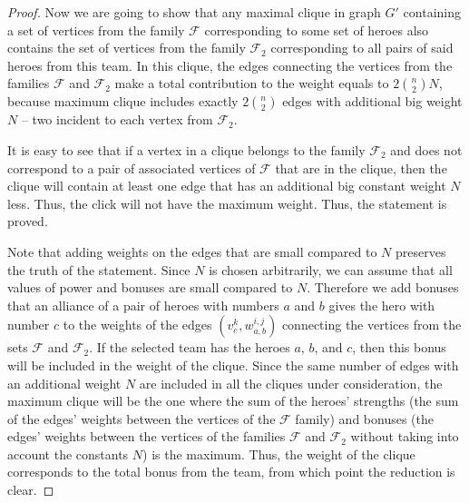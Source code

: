 \documentclass[smallextended]{svjour3}       %
\begin{document}
\begin{proof}
    
    Now we are going to show that any maximal clique in graph $G'$ containing a set of vertices from the family $\mathcal{F}$ corresponding to some set of heroes also contains the set of vertices from the family $\mathcal {F}_2$ corresponding to all pairs of said heroes from this team. In this clique, the edges connecting the vertices from the families $\mathcal{F}$ and $ \mathcal {F}_2$ make a total contribution to the weight equals to $2 \binom{n}{2} N$, because maximum clique includes exactly $2 \binom {n} {2}$ edges with additional big weight $N$ -- two incident to each vertex from $\mathcal {F}_2$.
    
    	It is easy to see that if a vertex in a clique belongs to the family $\mathcal{F}_2 $ and does not correspond to a pair of associated vertices of $ \mathcal {F} $ that are in the clique, then the clique will contain at least one edge that has an additional big constant weight $N$ less. Thus, the click will not have the maximum weight. Thus, the statement is proved.
    	
    	 Note that adding weights on the edges that are small compared to $ N $ preserves the truth of the statement. Since $ N $ is chosen arbitrarily, we can assume that all values of power and bonuses are small compared to $ N $. Therefore we add bonuses that an alliance of a pair of heroes with numbers $ a $ and $ b $ gives the hero with number $ c $ to the weights of the edges  $ (v_c^{k}, w_{a, b}^{i, j}) $ connecting the vertices from the sets $\mathcal {F}$ and $\mathcal {F}_2$. If the selected team has the heroes $a$, $b$, and $c$, then this bonus will be included in the weight of the clique. Since the same number of edges with an additional weight $ N$ are included in all the cliques under consideration, the maximum clique will be the one where the sum of the heroes' strengths (the sum of the edges’ weights between the vertices of the $\mathcal {F} $ family) and bonuses (the edges’ weights between the vertices of the families $\mathcal{F}$ and $\mathcal {F}_2$ without taking into account the constants $N$) is the maximum. Thus, the weight of the clique corresponds to the total bonus from the team, from which point the reduction is clear.
    
\end{proof}

\end{document}
